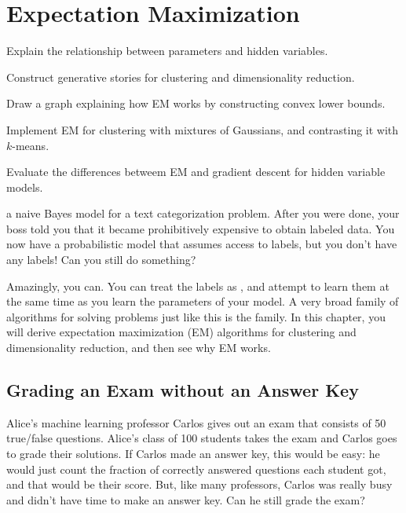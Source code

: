 
\chapter{Expectation Maximization} \label{sec:em}


\begin{learningobjectives}
\item Explain the relationship between parameters and hidden
  variables.
\item Construct generative stories for clustering and dimensionality
  reduction.
\item Draw a graph explaining how EM works by constructing convex
  lower bounds.
\item Implement EM for clustering with mixtures of Gaussians, and
  contrasting it with $k$-means.
\item Evaluate the differences betweem EM and gradient descent for
  hidden variable models.
\end{learningobjectives}

\dependencies{}

 a naive Bayes model for a text
categorization problem.  After you were done, your boss told you that
it became prohibitively expensive to obtain labeled data.  You now
have a probabilistic model that assumes access to labels, but you
don't have any labels!  Can you still do something?

Amazingly, you can.  You can treat the labels as , and attempt to learn them at the same time as you learn
the parameters of your model.  A very broad family of algorithms for
solving problems just like this is the  family.  In this chapter, you will derive expectation
maximization (EM) algorithms for clustering and dimensionality reduction,
and then see why EM works.

\section{Grading an Exam without an Answer Key}

Alice's machine learning professor Carlos gives out an exam that consists of 50 true/false questions.
Alice's class of 100 students takes the exam and Carlos goes to grade their solutions.
If Carlos made an answer key, this would be easy: he would just count the fraction of correctly answered questions each student got, and that would be their score.
But, like many professors, Carlos was really busy and didn't have time to make an answer key.
Can he still grade the exam?

